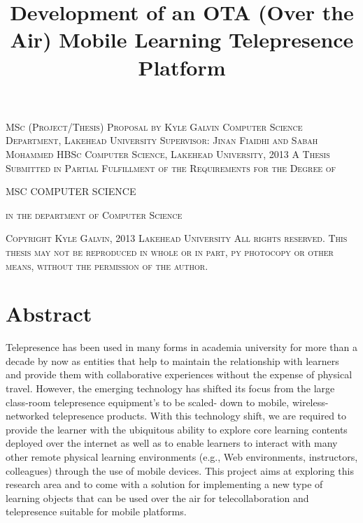 \documentclass[a4paper,12pt]{report}
\begin{document}
\begin{titlepage}
	\begin{center}
	\title{Development of an OTA (Over the Air) Mobile Learning Telepresence Platform}
	\textsc{\Large MSc (Project/Thesis) Proposal}
	\textsc{by}
	\textsc{\Large Kyle Galvin}
	\textsc{\Large Computer Science Department, Lakehead University}
	\textsc{\Large  Supervisor: Jinan Fiaidhi and Sabah Mohammed}
	\textsc{\Large HBSc Computer Science, Lakehead University, 2013}
	\textsc{\Large A Thesis Submitted in Partial Fulfillment of the Requirements for the Degree of}

	\textsc{\Large MSC COMPUTER SCIENCE}

	\textsc{\Large in the department of Computer Science}


	\textsc{Copyright Kyle Galvin, 2013}
	\textsc{Lakehead University}
	\textsc{All rights reserved. This thesis may not be reproduced in whole or in part, py photocopy or other means, without the permission of the author.}
	\end{center}
\end{titlepage}

\maketitle

\tableofcontents

\chapter*{\centering Abstract}
Telepresence has been used in many forms in academia university for more than a decade by now as entities that help to maintain the relationship with learners and provide them with collaborative experiences without the expense of physical travel. However, the emerging technology has shifted its focus from the large class-room telepresence equipment’s to be scaled- down to mobile, wireless-networked telepresence products. With this technology shift, we are required to provide the learner with the ubiquitous ability to explore core learning contents deployed over the internet as well as to enable learners to interact with many other remote physical learning environments (e.g., Web environments, instructors, colleagues) through the use of mobile devices. This project aims at exploring this research area and to come with a solution for implementing a new type of learning objects that can be used over the air for telecollaboration and telepresence suitable for mobile platforms. 
\end{document}
